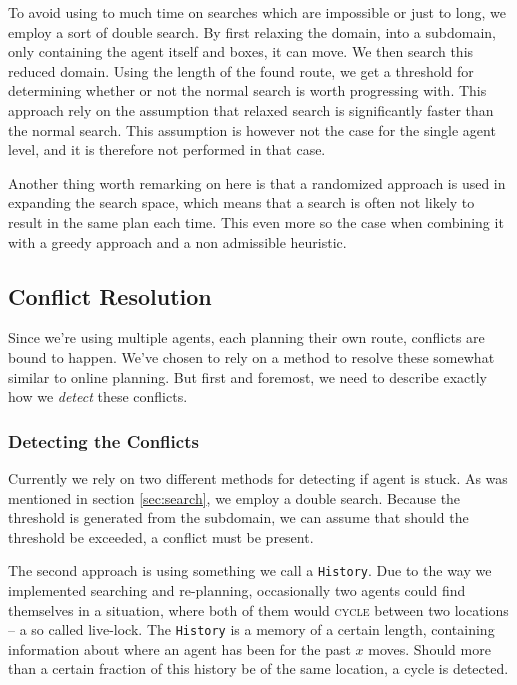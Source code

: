 \documentclass[letterpaper]{article}
\begin{document}
		
		To avoid using to much time on searches which are impossible or just to long, we employ a sort of double search. By first relaxing the domain, into a subdomain, only containing the agent itself and boxes, it can move. We then search this reduced domain. Using the length of the found route, we get a threshold for determining whether or not the normal search is worth progressing with. This approach rely on the assumption that relaxed search is significantly faster than the normal search. This assumption is however not the case for the single agent level, and it is therefore not performed in that case.
		
		
		
		
		Another thing worth remarking on here is that a randomized approach is used in expanding the search space, which means that a search is often not likely to result in the same plan each time. This even more so the case when combining it with a greedy approach and a non admissible heuristic.




	\subsection{Conflict Resolution}
		Since we're using multiple agents, each planning their own route, conflicts are bound to happen. We've chosen to rely on a method to resolve these somewhat similar to online planning. But first and foremost, we need to describe exactly how we \emph{detect} these conflicts.

		\subsubsection{Detecting the Conflicts}
			Currently we rely on two different methods for detecting if agent is stuck. As was mentioned in section \ref{sec:search}, we employ a double search. Because the threshold is generated from the subdomain, we can assume that should the threshold be exceeded, a conflict must be present.

			The second approach is using something we call a \verb=History=. Due to the way we implemented searching and re-planning, occasionally two agents could find themselves in a situation, where both of them would \textsc{cycle} between two locations -- a so called live-lock. The \verb=History= is a memory of a certain length, containing information about where an agent has been for the past $x$ moves. Should more than a certain fraction of this history be of the same location, a cycle is detected.
\end{document}
